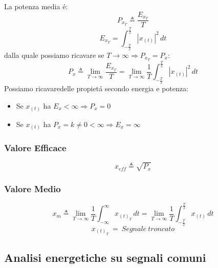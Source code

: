             La potenza media é:
            \[
                P_{x_{T}} \triangleq \frac{E_{x_{T}}}{T}    
            \]
            \[
                E_{x_{T}} = \int_{-\frac{T}{2}}^{\frac{T}{2}}  |x_{(t)}|^2 \,dt  
            \]
            dalla quale possiamo ricavare se $T \rightarrow \infty \Rightarrow P_{x_{T}} = P_{x}$:
            \[
                P_{x} \triangleq \lim_{T\rightarrow\infty} \frac{E_{x_{T}}}{T} =\lim_{T\rightarrow\infty} \frac{1}{T} \int_{-\frac{T}{2}}^{\frac{T}{2}}  |x_{(t)}|^2 \,dt    
            \]  
            Possiamo ricavaredelle propietá secondo energia e potenza:
            \begin{itemize}
                \item Se $x_{(t)}$ ha $E_x < \infty \Rightarrow P_x = 0$
                \item Se $x_{(t)}$ ha $P_x = k \neq 0 < \infty \Rightarrow E_x = \infty$
            \end{itemize}
        \subsubsection{Valore Efficace}\label{Valore Efficace}
                \[    
                    x_{eff} \triangleq \sqrt{P_{x}}
                \]
        
        \subsubsection{Valore Medio}\label{Valore medio}

                    \[
                        x_{m} \triangleq \lim_{T\rightarrow\infty} \frac{1}{T} \int_{-\infty}^{\infty}  x_{(t)_T} \,dt = \lim_{T\rightarrow\infty} \frac{1}{T} \int_{-\frac{T}{2}}^{\frac{T}{2}}  x_{(t)} \,dt 
                    \]
                    \[
                        x_{(t)_T}\ =\ Segnale\ troncato
                    \]
                    
    \subsection{Analisi energetiche su segnali comuni}
